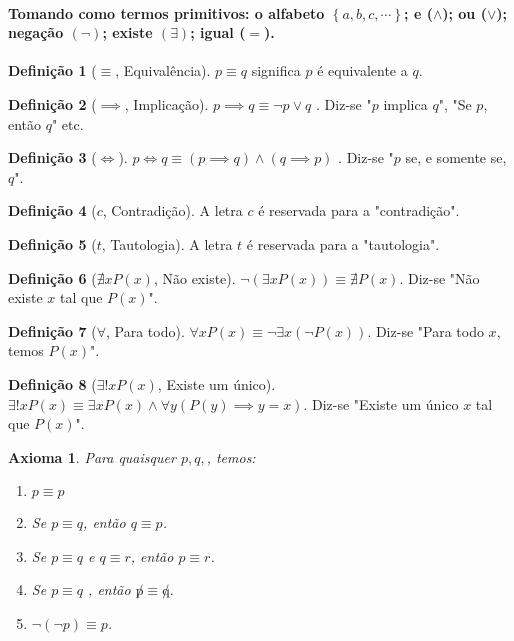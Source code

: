 \documentclass{article}
\newtheorem{axioma}{Axioma}
\theoremstyle{theorem}
\theoremstyle{lemma}
\theoremstyle{definition}
\newtheorem{definicao}{Definição}[section]
\theoremstyle{remark}
\begin{document}
\paragraph{Tomando como termos primitivos: o alfabeto $\left\{ a, b, c,\cdots \right\}$; e ($\land$); ou ($\lor$); negação $(\neg)$; existe $(\exists)$; igual ($=$).}
\begin{definicao}[$\equiv$, Equivalência]
	$p \equiv q$ significa $p $ é  equivalente a $q$.
\end{definicao}
\begin{definicao}[$\implies$, Implicação]
	$p \implies q \equiv \neg p \lor q$ . Diz-se "$p$ implica $q$", "Se $p$, então $q$" etc.
\end{definicao}
\begin{definicao}[$\iff$]
	$p \iff q \equiv ( p \implies q) \land (q \implies p)$ . Diz-se "$p$ se, e somente se, $q$".
\end{definicao}
\begin{definicao}[$c$, Contradição]
	A letra $c$ é reservada para a "contradição".
\end{definicao}
\begin{definicao}[$t$, Tautologia]
	A letra $t$ é reservada para a "tautologia".
\end{definicao}
\begin{definicao}[$ \nexists x  P(x)$, Não existe]
	$\neg (\exists x  P(x))  \equiv \nexists  P(x)$. Diz-se "Não existe $x$ tal que $P(x)$".
\end{definicao}
\begin{definicao}[$\forall$, Para todo]
	$\forall x P(x) \equiv \neg \exists x ( \neg P(x) )$. Diz-se "Para todo $x$, temos $P(x)$".
\end{definicao}
\begin{definicao}[$ \exists! x  P(x)$, Existe um único]
	$\exists! x  P(x)  \equiv \exists x  P(x)  \land  \forall y ( P(y) \implies y =x ) $. Diz-se "Existe um único $x$ tal que $P(x)$".
\end{definicao}
\begin{axioma}
	Para quaisquer $p,q,$, temos:
	\begin{enumerate}
		\item $p\equiv p$
		\item Se $p\equiv q$, então $q\equiv p$.
		\item Se $p\equiv q$ e $q \equiv r$, então $p\equiv r$.
		\item Se $p\equiv q$ , então $\not p\equiv \not q$.
		\item $\neg (\neg p ) \equiv p$.
	\end{enumerate}
\end{axioma}
\end{document}
